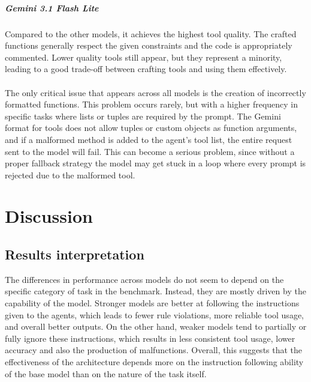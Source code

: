 \documentclass[12pt,a4paper,openright,twoside]{book}
\begin{document}
\paragraph{Gemini 3.1 Flash Lite} Compared to the other models, it achieves the highest tool quality. The crafted functions generally respect the given constraints and the code is appropriately commented.
Lower quality tools still appear, but they represent a minority, leading to a good trade-off between crafting tools and using them effectively. 
\\\\
The only critical issue that appears across all models is the creation of incorrectly formatted functions. This problem occurs rarely, but with a higher frequency in specific tasks where lists or tuples are required by the prompt.
%
The Gemini format for tools does not allow tuples or custom objects as function arguments, and if a malformed method is added to the agent's tool list, the entire request sent to the model will fail.
This can become a serious problem, since without a proper fallback strategy the model may get stuck in a loop where every prompt is rejected due to the malformed tool.

\chapter{Discussion}
\label{chap:discussion}
\section{Results interpretation}
The differences in performance across models do not seem to depend on the specific category of task in the benchmark. 
Instead, they are mostly driven by the capability of the model. Stronger models are better at following the instructions given to the agents, which leads to fewer rule violations, more reliable tool usage, and overall better outputs. 
On the other hand, weaker models tend to partially or fully ignore these instructions, which results in less consistent tool usage, lower accuracy and also the production of malfunctions. 
Overall, this suggests that the effectiveness of the architecture depends more on the instruction following ability of the base model than on the nature of the task itself.
\end{document}
